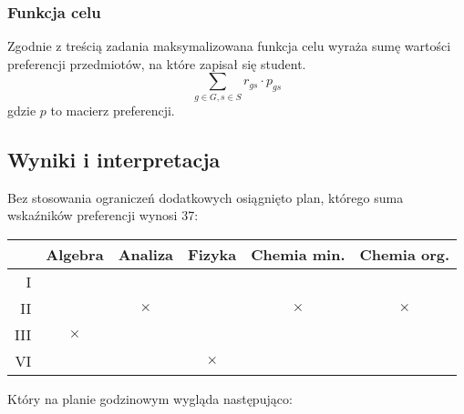\documentclass{article}
\begin{document}
\subsubsection{Funkcja celu}
Zgodnie z treścią zadania maksymalizowana funkcja celu wyraża sumę wartości preferencji przedmiotów, na które zapisał się student.
\[\sum_{g \in G, s \in S}{r_{gs} \cdot p_{gs}}\]
gdzie $p$ to macierz preferencji.
\subsection{Wyniki i interpretacja}

Bez stosowania ograniczeń dodatkowych osiągnięto plan, którego suma wskaźników preferencji wynosi 37:

\begin{table}[H]
	\centering
	\begin{tabular}{r|c|c|c|c|c|}
		& Algebra & Analiza & Fizyka & Chemia min. & Chemia org.\\\hline
		I & & & & & \\\hline
		II & & $\times$ & & $\times$ & $\times$ \\\hline
		III & $\times$ & & & & \\\hline
		VI & & & $\times$ & & \\\hline
	\end{tabular}
\end{table}

Który na planie godzinowym wygląda następująco:
\end{document}
